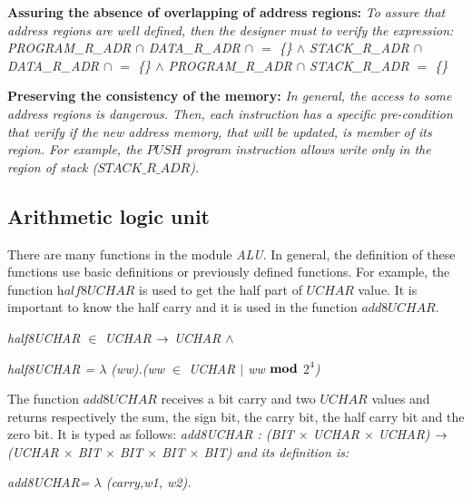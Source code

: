 \documentclass[a4paper]{llncs}
\begin{document}
\textbf{Assuring the absence of overlapping of address regions:}
 \emph{To assure that address regions are well defined, then the designer must to verify the expression:}
\it PROGRAM\_R\_ADR $\cap$ DATA\_R\_ADR $\cap$ $=$ \{\} $\land$ STACK\_R\_ADR $\cap$ DATA\_R\_ADR $\cap$ $=$ \{\} $\land$ PROGRAM\_R\_ADR $\cap$  STACK\_R\_ADR  $=$ \{\} \rm
 
\textbf{Preserving the consistency of the memory:} \emph{In general, the access to
some address regions is dangerous. Then, each instruction has a specific pre-condition that verify
if the new address memory, that will be updated, is member of its region. For example, the $\textit{PUSH}$
program instruction allows write only in the region of stack ($\textit{STACK\_R\_ADR}$\rm).}



\subsection{Arithmetic logic unit}
 
There are many functions in the module \textit{ALU}. In general, the definition of these 
functions use basic definitions or previously defined functions. For example, the function
$\textit{half8UCHAR}$ is used to get the half part of $\textit{UCHAR}$ value.
It is important to know the half carry and it is used in the function $\textit{add8UCHAR}$. 

\hspace*{0.0in}\it half8UCHAR  $\in$  \it UCHAR  $\fun$  \it UCHAR  $\land$ 

\hspace*{0.0in}\it half8UCHAR \rm =  $\lambda$  \rm (\it ww\rm )\rm .\rm (\it ww  $\in$  \it UCHAR  $\mid$  \it ww  $\mod$  \it $2^{4}$\rm )


 
The function $\textit{add8UCHAR}$ receives a bit carry and two $\textit{UCHAR}$ values and returns respectively the 
sum, the sign bit, the carry bit, the half carry bit and the zero bit. It is typed as follows: \it add8UCHAR \rm :
\rm (\it BIT $\times$ \it UCHAR $\times$ \it UCHAR\rm ) $\fun$ \rm (\it UCHAR $\times$  \it BIT  $\times$  \it BIT  $\times$  \it BIT  $\times$  \it BIT\rm ) and its definition is:

\hspace*{0.0in}\it add8UCHAR\rm = $\lambda$ \rm(\it carry\rm,\it w1\rm, \it w2\rm)\rm.\rm
\end{document}

